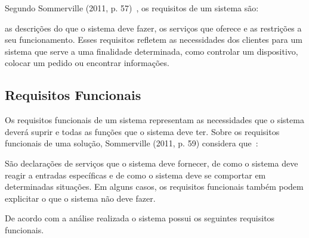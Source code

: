 Segundo Sommerville (2011, p. 57)~\cite{SOMMERVILLE1}, os requisitos de um sistema são:

\begin{directcite}
as descrições do que o sistema deve fazer, os serviços que oferece e as restrições a seu funcionamento.
Esses requisitos refletem as necessidades dos clientes para um sistema que serve a uma finalidade determinada, como controlar um dispositivo, colocar um pedido ou encontrar informações.
\end{directcite}

\subsection{Requisitos Funcionais}

Os requisitos funcionais de um sistema representam as necessidades que o sistema deverá suprir e todas as funções que o sistema deve ter.
Sobre os requisitos funcionais de uma solução, Sommerville (2011, p. 59) considera que~\cite{SOMMERVILLE1}:

\begin{directcite}
São declarações de serviços que o sistema deve fornecer, de como
o sistema deve reagir a entradas específicas e de como o sistema
deve se comportar em determinadas situações. Em alguns casos, os
requisitos funcionais também podem explicitar o que o sistema não
deve fazer.
\end{directcite}

De acordo com a análise realizada o sistema possui os seguintes requisitos funcionais.

